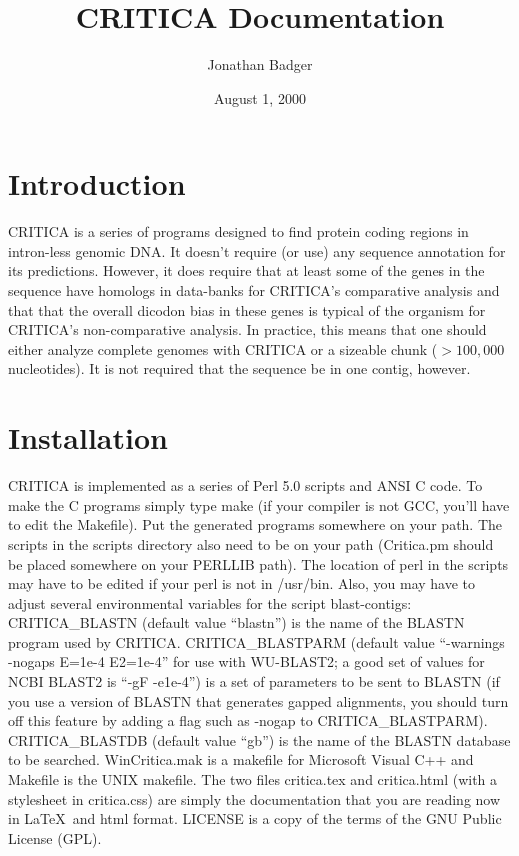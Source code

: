 \documentclass{article}
\begin{document}
\title{CRITICA Documentation}
\date{August 1, 2000}
\author{Jonathan Badger}
\maketitle
\tableofcontents
\newpage
\section{Introduction}

CRITICA is a series of programs designed to find protein coding
regions in intron-less genomic DNA. It doesn't require (or use) any
sequence annotation for its predictions. However, it does require that
at least some of the genes in the sequence have homologs in data-banks
for CRITICA's comparative analysis and that that the overall dicodon
bias in these genes is typical of the organism for CRITICA's
non-comparative analysis. In practice, this means that one should
either analyze complete genomes with CRITICA or a sizeable chunk
($>100,000$ nucleotides). It is not required that the sequence be in one
contig, however.

\section{Installation}

CRITICA is implemented as a series of Perl 5.0 scripts and ANSI C
code. To make the C programs simply type make (if your compiler is not
GCC, you'll have to edit the Makefile). Put the generated programs
somewhere on your path. The scripts in the scripts directory also need
to be on your path (Critica.pm should be placed somewhere on your
PERLLIB path). The location of perl in the scripts may have to be
edited if your perl is not in /usr/bin. Also, you may have to adjust
several environmental variables for the script blast-contigs:
CRITICA\_BLASTN (default value ``blastn'') is the name of the BLASTN
program used by CRITICA. CRITICA\_BLASTPARM (default value ``-warnings
-nogaps E=1e-4 E2=1e-4'' for use with WU-BLAST2; a good set of values
for NCBI BLAST2 is ``-gF -e1e-4'') is a set of parameters to be sent
to BLASTN (if you use a version of BLASTN that generates gapped
alignments, you should turn off this feature by adding a flag such as
-nogap to CRITICA\_BLASTPARM). CRITICA\_BLASTDB (default value ``gb'')
is the name of the BLASTN database to be searched. WinCritica.mak is a
makefile for Microsoft Visual C++ and Makefile is the UNIX
makefile. The two files critica.tex and critica.html (with a
stylesheet in critica.css) are simply the documentation that you are
reading now in \LaTeX~and html format. LICENSE is a copy of the terms
of the GNU Public License (GPL).
\end{document}
